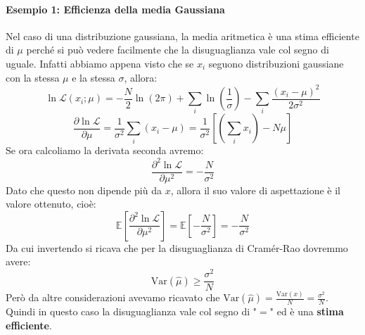\documentclass[openany,a4paper,12pt]{book}
\providecommand{\mathscr}[1]{\mathcal{#1}}
\theoremstyle{remark}
\begin{document}
\paragraph{Esempio 1: Efficienza della media Gaussiana}
Nel caso di una distribuzione gaussiana, la media aritmetica è una stima efficiente di $\mu$ perché si può vedere facilmente che la disuguaglianza vale col segno di uguale.
Infatti abbiamo appena visto che se $x_i$ seguono distribuzioni gaussiane con la stessa $\mu$ e la stessa $\sigma$, allora:
\begin{equation}
    \ln \mathscr{L}(x_i; \mu) = -\frac{N}{2} \ln(2\pi) + \sum_i \ln\left(\frac{1}{\sigma}\right) - \sum_i \frac{(x_i - \mu)^2}{2\sigma^2}
\end{equation}
\begin{equation}
    \frac{\partial \ln \mathscr{L}}{\partial \mu} = \frac{1}{\sigma^2} \sum_i (x_i - \mu) = \frac{1}{\sigma^2} \left[ \left(\sum_i x_i\right) - N\mu \right]
\end{equation}
Se ora calcoliamo la derivata seconda avremo:
\begin{equation}
    \frac{\partial^2 \ln \mathscr{L}}{\partial \mu^2} = -\frac{N}{\sigma^2}
\end{equation}
Dato che questo non dipende più da $x$, allora il suo valore di aspettazione è il valore ottenuto, cioè:
\begin{equation}
    \mathbb{E}\left[ \frac{\partial^2 \ln \mathscr{L}}{\partial \mu^2} \right] = \mathbb{E}\left[ -\frac{N}{\sigma^2} \right] = -\frac{N}{\sigma^2}
\end{equation}
Da cui invertendo si ricava che per la disuguaglianza di Cramér-Rao dovremmo avere:
\begin{equation}
    \mathrm{Var}(\hat{\mu}) \geq \frac{\sigma^2}{N}
\end{equation}
Però da altre considerazioni avevamo ricavato che $\mathrm{Var}(\hat{\mu}) = \frac{\mathrm{Var}(x)}{N} = \frac{\sigma^2}{N}$. Quindi in questo caso la disuguaglianza vale col segno di "$=$" ed è una \textbf{stima efficiente}.
\end{document}
